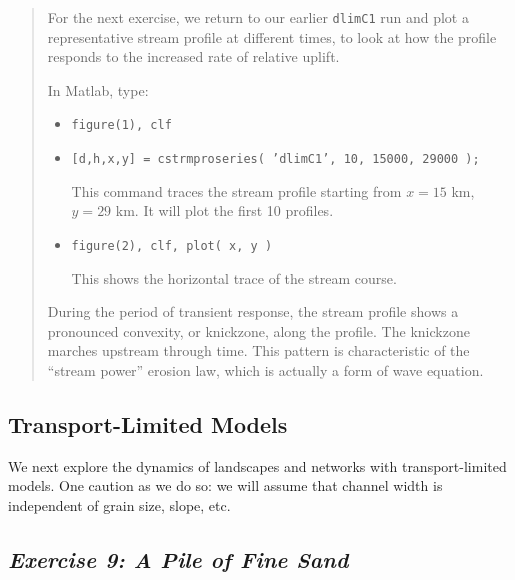 \documentclass[12pt,reqno]{amsart}
\begin{document}
\begin{quote}
\small
{\sf
For the next exercise, we return to our earlier {\tt dlimC1} run and plot a representative stream profile at different times, to look at how the profile responds to the increased rate of relative uplift.

\noindent
In Matlab, type: 
\begin{itemize}
\item
{\tt figure(1), clf}
\item
{\tt [d,h,x,y] = cstrmproseries( 'dlimC1', 10, 15000, 29000 );}

\noindent
This command traces the stream profile starting from $x=15$ km, $y=29$
km. It will plot the first 10 profiles.
\item
{\tt figure(2), clf, plot( x, y )}

\noindent
This shows the horizontal trace of the stream course.
\end{itemize}

\noindent
During the period of transient response, the stream profile shows a
pronounced convexity, or knickzone, along the profile. The knickzone
marches upstream through time. This pattern is characteristic of the
``stream power'' erosion law, which is actually a form of wave
equation.
}
\end{quote}

\subsection{Transport-Limited Models}

We next explore the dynamics of landscapes and networks with transport-limited models. One caution as we do so: we will assume that channel width is independent of grain size, slope, etc.

\subsection*{\em Exercise 9: A Pile of Fine Sand}
\end{document}
